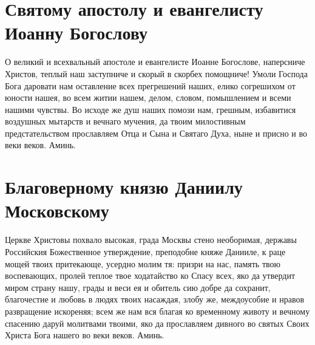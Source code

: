 \mychapterending




\section{Святому апостолу и евангелисту Иоанну Богослову}\begin{mymulticols}



О великий и всехвальный апостоле и евангелисте Иоанне Богослове, наперсниче Христов, теплый наш заступниче и скорый в скорбех помощниче! Умоли Господа Бога даровати нам оставление всех прегрешений наших, елико согрешихом от юности нашея, во всем житии нашем, делом, словом, помышлением и всеми нашими чувствы. Во исходе же душ наших помози нам, грешным, избавитися воздушных мытарств и вечнаго мучения, да твоим милостивным предстательством прославляем Отца и Сына и Святаго Духа, ныне и присно и во веки веков. Аминь.

\end{mymulticols}

\section{Благоверному князю Даниилу Московскому}\begin{mymulticols}



Церкве Христовы похвало высокая, града Москвы стено необоримая, державы Российския Божественное утверждение, преподобне княже Данииле, к раце мощей твоих притекающе, усердно молим тя: призри на нас, память твою воспевающих, пролей теплое твое ходатайство ко Спасу всех, яко да утвердит миром страну нашу, грады и веси ея и обитель сию добре да сохранит, благочестие и любовь в людях твоих насаждая, злобу же, междоусобие и нравов развращение искореняя; всем же нам вся благая ко временному животу и вечному спасению даруй молитвами твоими, яко да прославляем дивного во святых Своих Христа Бога нашего во веки веков. Аминь.



\end{mymulticols}

